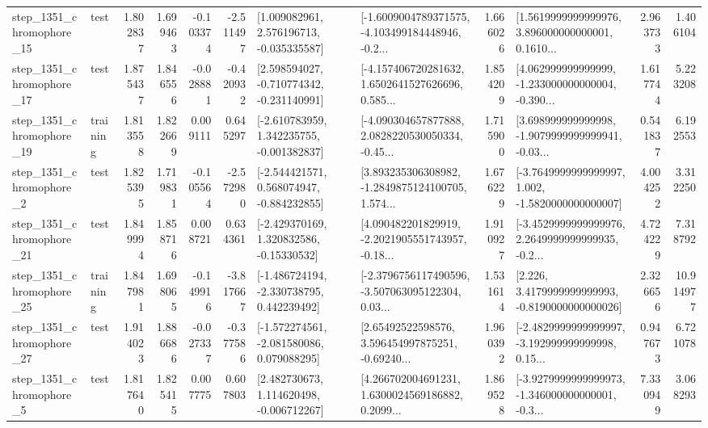 \begin{tabular}{llrrrrllrlrr}
 step\_1351\_chromophore\_15 &      test &      1.802837 &    1.699463 &     -0.103374 & -2.511497 &    [1.009082961, 2.576196713, -0.035335587] &  [-1.6009004789371575, -4.103499184448946, -0.2... &       1.666026 &  [1.5619999999999976, 3.896000000000001, 0.1610... &            2.963733 &          1.406104 \\
 step\_1351\_chromophore\_17 &      test &      1.875437 &    1.846556 &     -0.028881 & -0.420932 &   [2.598594027, -0.710774342, -0.231140991] &  [-4.157406720281632, 1.6502641527626696, 0.585... &       1.854209 &  [4.062999999999999, -1.233000000000004, -0.390... &            1.617744 &          5.223208 \\
 step\_1351\_chromophore\_19 &  training &      1.813558 &    1.822669 &      0.009111 &  0.645297 &   [-2.610783959, 1.342235755, -0.001382837] &  [-4.090304657877888, 2.0828220530050334, -0.45... &       1.715900 &  [3.698999999999998, -1.9079999999999941, -0.03... &            0.541837 &          6.192553 \\
  step\_1351\_chromophore\_2 &      test &      1.825395 &    1.719831 &     -0.105564 & -2.572980 &   [-2.544421571, 0.568074947, -0.884232855] &  [3.893235306308982, -1.2849875124100705, 1.574... &       1.676229 &  [-3.7649999999999997, 1.002, -1.5820000000000007] &            4.004252 &          3.312250 \\
 step\_1351\_chromophore\_21 &      test &      1.849994 &    1.858716 &      0.008721 &  0.634361 &    [-2.429370169, 1.320832586, -0.15330532] &  [4.090482201829919, -2.2021905551743957, -0.18... &       1.910927 &  [-3.4529999999999976, 2.2649999999999935, -0.2... &            4.724229 &          7.318792 \\
 step\_1351\_chromophore\_25 &  training &      1.847981 &    1.698065 &     -0.149916 & -3.817667 &   [-1.486724194, -2.330738795, 0.442239492] &  [-2.3796756117490596, -3.507063095122304, 0.03... &       1.531614 &   [2.226, 3.4179999999999993, -0.8190000000000026] &            2.326656 &         10.914977 \\
 step\_1351\_chromophore\_27 &      test &      1.914023 &    1.886686 &     -0.027337 & -0.377586 &   [-1.572274561, -2.081580086, 0.079088295] &  [2.65492522598576, 3.596454997875251, -0.69240... &       1.960392 &  [-2.4829999999999997, -3.192999999999998, 0.15... &            0.947673 &          6.721078 \\
  step\_1351\_chromophore\_5 &      test &      1.817640 &    1.825415 &      0.007775 &  0.607803 &    [2.482730673, 1.114620498, -0.006712267] &  [4.266702004691231, 1.6300024569186882, 0.2099... &       1.869528 &  [-3.9279999999999973, -1.346000000000001, -0.3... &            7.330949 &          3.068293 \\

\end{tabular}
